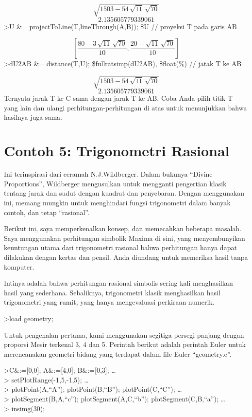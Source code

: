 \documentclass[
]{book}
\begin{document}
\[\sqrt{1503-54\,\sqrt{11}\,\sqrt{70}}\] \[2.135605779339061\]\textgreater U \&= projectToLine(T,lineThrough(A,B)); \$U // proyeksi T pada garis AB

\[\left[ \frac{80-3\,\sqrt{11}\,\sqrt{70}}{10} , \frac{20-\sqrt{11}\,\sqrt{70}}{10} \right]\]\textgreater dU2AB \&= distance(T,U); \$fullratsimp(dU2AB), \$float(\%) // jatak T ke AB

\[\sqrt{1503-54\,\sqrt{11}\,\sqrt{70}}\] \[2.135605779339061\]Ternyata jarak T ke C sama dengan jarak T ke AB. Coba Anda pilih titik T yang lain dan ulangi perhitungan-perhitungan di atas untuk menunjukkan bahwa hasilnya juga sama.

\section{Contoh 5: Trigonometri Rasional}\label{contoh-5-trigonometri-rasional}

Ini terinspirasi dari ceramah N.J.Wildberger. Dalam bukunya ``Divine Proportions'', Wildberger mengusulkan untuk mengganti pengertian klasik tentang jarak dan sudut dengan kuadrat dan penyebaran. Dengan menggunakan ini, memang mungkin untuk menghindari fungsi trigonometri dalam banyak contoh, dan tetap ``rasional''.

Berikut ini, saya memperkenalkan konsep, dan memecahkan beberapa masalah. Saya menggunakan perhitungan simbolik Maxima di sini, yang menyembunyikan keuntungan utama dari trigonometri rasional bahwa perhitungan hanya dapat dilakukan dengan kertas dan pensil. Anda diundang untuk memeriksa hasil tanpa komputer.

Intinya adalah bahwa perhitungan rasional simbolis sering kali menghasilkan hasil yang sederhana. Sebaliknya, trigonometri klasik menghasilkan hasil trigonometri yang rumit, yang hanya mengevaluasi perkiraan numerik.

\textgreater load geometry;

Untuk pengenalan pertama, kami menggunakan segitiga persegi panjang dengan proporsi Mesir terkenal 3, 4 dan 5. Perintah berikut adalah perintah Euler untuk merencanakan geometri bidang yang terdapat dalam file Euler ``geometry.e''.

\textgreater C\&:={[}0,0{]}; A\&:={[}4,0{]}; B\&:={[}0,3{]}; \ldots{}\\
\textgreater{} setPlotRange(-1,5,-1,5); \ldots{}\\
\textgreater{} plotPoint(A,``A''); plotPoint(B,``B''); plotPoint(C,``C''); \ldots{}\\
\textgreater{} plotSegment(B,A,``c''); plotSegment(A,C,``b''); plotSegment(C,B,``a''); \ldots{}\\
\textgreater{} insimg(30);
\end{document}
